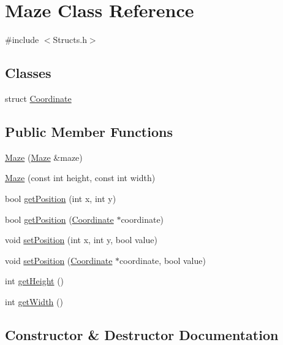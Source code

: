 \hypertarget{class_maze}{}\section{Maze Class Reference}
\label{class_maze}


{\ttfamily \#include $<$Structs.\+h$>$}

\subsection*{Classes}
\begin{DoxyCompactItemize}
\item 
struct \hyperlink{struct_maze_1_1_coordinate}{Coordinate}
\end{DoxyCompactItemize}
\subsection*{Public Member Functions}
\begin{DoxyCompactItemize}
\item 
\hyperlink{class_maze_a855688554f7e9cfc74c070de80d57514}{Maze} (\hyperlink{class_maze}{Maze} \&maze)
\item 
\hyperlink{class_maze_ad5b94270dabca58abadebb18969b0763}{Maze} (const int height, const int width)
\item 
bool \hyperlink{class_maze_afee42b489cd82269f995721a92bbe388}{get\+Position} (int x, int y)
\item 
bool \hyperlink{class_maze_a6211fad0a22e3049fd3609993bdb9466}{get\+Position} (\hyperlink{struct_maze_1_1_coordinate}{Coordinate} $\ast$coordinate)
\item 
void \hyperlink{class_maze_ad88a1e9bfe95d8ffe89cdd1a74db9688}{set\+Position} (int x, int y, bool value)
\item 
void \hyperlink{class_maze_a07acd2a1fbab38d11b5e909d97aa4ea4}{set\+Position} (\hyperlink{struct_maze_1_1_coordinate}{Coordinate} $\ast$coordinate, bool value)
\item 
int \hyperlink{class_maze_a7a775b6ee3a10f62f827d9ca358eb0bb}{get\+Height} ()
\item 
int \hyperlink{class_maze_a0d94d724bf089307d105d81881e91dcd}{get\+Width} ()
\end{DoxyCompactItemize}


\subsection{Constructor \& Destructor Documentation}
